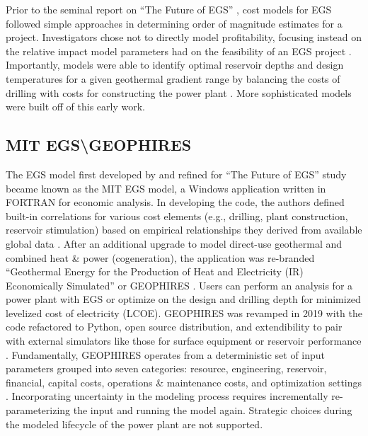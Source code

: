 Prior to the seminal report on ``The Future of EGS'' \citep{tester_future_2006}, cost models for EGS followed simple approaches in determining order of magnitude estimates for a project. Investigators chose not to directly model profitability, focusing instead on the relative impact model parameters had on the feasibility of an EGS project \citep{augustine_hydrothermal_2009}. Importantly, models were able to identify optimal reservoir depths and design temperatures for a given geothermal gradient range by balancing the costs of drilling with costs for constructing the power plant \citep{tester_economic_1990}. More sophisticated models were built off of this early work.

\subsection{MIT EGS\textbackslash GEOPHIRES}\label{ch2:geophires}
The EGS model first developed by \citet{tester_economic_1990} and refined for ``The Future of EGS'' study \citep{tester_future_2006} became known as the MIT EGS model, a Windows application written in FORTRAN for economic analysis. In developing the code, the authors defined built-in correlations for various cost elements (e.g., drilling, plant construction, reservoir stimulation) based on empirical relationships they derived from available global data \citep{tester_future_2006}. After an additional upgrade to model direct-use geothermal and combined heat \& power (cogeneration), the application was re-branded ``Geothermal Energy for the Production of Heat and Electricity (IR) Economically Simulated'' or GEOPHIRES \citep{beckers_introducing_2013}. Users can perform an analysis for a power plant with EGS or optimize on the design and drilling depth for minimized levelized cost of electricity (LCOE). GEOPHIRES was revamped in 2019 with the code refactored to Python, open source distribution, and extendibility to pair with external simulators like those for surface equipment or reservoir performance \citep{beckers_geophires_2019}. Fundamentally, GEOPHIRES operates from a deterministic set of input parameters grouped into seven categories: resource, engineering, reservoir, financial, capital costs, operations \& maintenance costs, and optimization settings \citep{beckers_introducing_2013}. Incorporating uncertainty in the modeling process requires incrementally re-parameterizing the input and running the model again. Strategic choices during the modeled lifecycle of the power plant are not supported.

